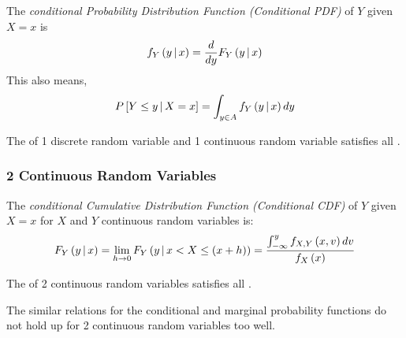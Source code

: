 \begin{definition}\label{def:1 Discrete 1 Continuous-Conditional PDF}
  The \emph{conditional Probability Distribution Function (Conditional PDF)} of $Y$ given $X=x$ is
  \begin{equation}\label{eq:1 Discrete 1 Continuous-Conditional PDF}
    f_{Y} \left( y \operatorname{\vert} x \right) = \frac{d}{dy} F_{Y} \left( y \operatorname{\vert} x \right)
  \end{equation}
  This also means,
  \begin{equation*}
    P \left[ Y \leq y \operatorname{\vert} X=x \right]
    = \int_{y \in A} f_{Y} \left( y \operatorname{\vert} x \right) dy
  \end{equation*}
  \begin{remark}
    The  of 1 discrete random variable and 1 continuous random variable satisfies all .
  \end{remark}
\end{definition}

\subsubsection{2 Continuous Random Variables}\label{subsubsec:2 Continuous Random Variables}
\begin{definition}\label{def:2 Continuous-Conditional CDF}
  The \emph{conditional Cumulative Distribution Function (Conditional CDF)} of $Y$ given $X=x$ for $X$ and $Y$ continuous random variables is:
  \begin{equation}\label{eq:2 Continuous-Conditional CDF}
    F_{Y} \left(y \operatorname{\vert} x \right)
    = \lim\limits_{h\to 0} F_{Y} \left( y \operatorname{\vert} x < X \leq \left( x+h \right) \right)
    = \frac{\int_{-\infty}^{y} f_{X,Y} \left( x,v \right) dv}{f_{X} \left( x \right)}
  \end{equation}
  \begin{remark}
    The  of 2 continuous random variables satisfies all .
  \end{remark}
  \begin{remark}
    The similar relations for the conditional and marginal probability functions do not hold up for 2 continuous random variables too well.
  \end{remark}
\end{definition}


